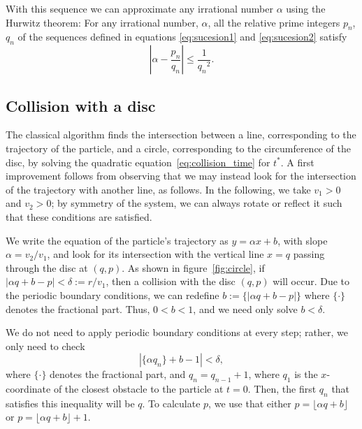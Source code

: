 \documentclass[pre,amsmath,amssymb, twocolumn, showpacs]{revtex4-1}
\begin{document}
With this sequence we can approximate any irrational number $\alpha$ using the Hurwitz theorem:
For any irrational number, $\alpha$, all the relative prime integers $p_n$, $q_n$ of the sequences defined in equations \eqref{eq:sucesion1} and \eqref{eq:sucesion2} satisfy 
\begin{equation}
|\alpha- \frac{p_n}{q_n}|\leq  \frac{1}{{q_n}^2}.
\end{equation}


\subsection{Collision with a disc}
The classical algorithm finds the intersection between a line, corresponding to the trajectory of 
the particle, and a circle, corresponding to the circumference of the disc, by solving the quadratic equation~\eqref{eq:collision_time} for $t^{\ast}$. A first improvement follows from observing that we may instead look for the intersection of the trajectory with another line, as follows.  In the following, we take $v_1>0$ and $v_2>0$; by symmetry of the system, we can always rotate or reflect it such that these conditions are satisfied.


We write the equation of the particle's trajectory as $y=\alpha x+b$, with slope $\alpha = v_{2} / v_{1}$, and look for its intersection with the vertical line $x=q$ passing through the disc at $(q,p)$. As shown in figure~\ref{fig:circle}, if $|\alpha q+b-p| < \delta := r/v_1$, then a collision with the disc $(q,p)$ will occur. Due to the periodic boundary conditions, we can redefine $b := \{|\alpha q+b-p|\}$ where $\{\cdot\}$ denotes the fractional part. Thus, $0 < b < 1$, and we need only solve $b<\delta$.

We do not need to apply periodic boundary conditions at every step; rather, we only need to check 
\begin{equation}
|\{ \alpha  q_n \}+b -1|< \delta, 
\label{eq:master}
\end{equation}
where $\{ \cdot \}$ denotes the fractional part, and $q_n=q_{n-1}+1$, where $q_1$ is the $x$-coordinate of the closest obstacle to the particle at $t=0$. Then, the first $q_n$ that satisfies this inequality will be $q$. To calculate $p$, we use that either $p=\lfloor \alpha q +b\rfloor$ or $p=\lfloor \alpha q +b\rfloor+1$.
\end{document}
